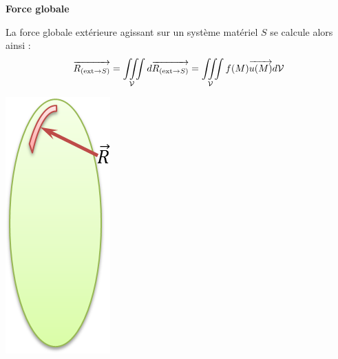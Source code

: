 \documentclass[10pt]{article}
\begin{document}
\begin{defi}
\begin{minipage}[c]{.65\linewidth}
\textbf{Force globale}

La force globale extérieure agissant sur un système matériel $S$ se calcule alors ainsi : 
$$
\overrightarrow{R_{(\text{ext}\rightarrow S)}} 
= \iiint\limits_{\mathcal{V}} d\overrightarrow{R_{(\text{ext}\rightarrow S)}} 
= \iiint\limits_{\mathcal{V}} f(M) \overrightarrow{u(M)} d\mathcal{V}
$$
\end{minipage} \hfill
\begin{minipage}[c]{.3\linewidth}
\begin{center}
\includegraphics[width=.5\textwidth]{images/global}
\end{center}
\end{minipage}
\end{defi}
\end{document}
